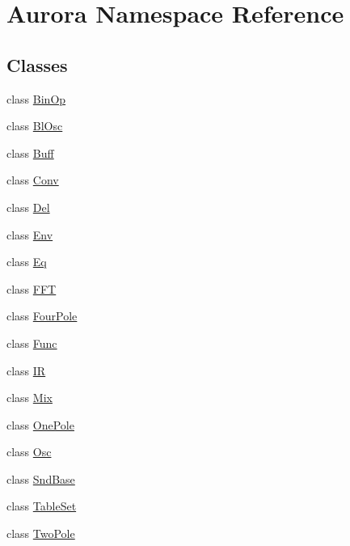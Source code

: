 \hypertarget{namespace_aurora}{}\section{Aurora Namespace Reference}
\label{namespace_aurora}
\subsection*{Classes}
\begin{DoxyCompactItemize}
\item 
class \hyperlink{class_aurora_1_1_bin_op}{Bin\+Op}
\item 
class \hyperlink{class_aurora_1_1_bl_osc}{Bl\+Osc}
\item 
class \hyperlink{class_aurora_1_1_buff}{Buff}
\item 
class \hyperlink{class_aurora_1_1_conv}{Conv}
\item 
class \hyperlink{class_aurora_1_1_del}{Del}
\item 
class \hyperlink{class_aurora_1_1_env}{Env}
\item 
class \hyperlink{class_aurora_1_1_eq}{Eq}
\item 
class \hyperlink{class_aurora_1_1_f_f_t}{F\+FT}
\item 
class \hyperlink{class_aurora_1_1_four_pole}{Four\+Pole}
\item 
class \hyperlink{class_aurora_1_1_func}{Func}
\item 
class \hyperlink{class_aurora_1_1_i_r}{IR}
\item 
class \hyperlink{class_aurora_1_1_mix}{Mix}
\item 
class \hyperlink{class_aurora_1_1_one_pole}{One\+Pole}
\item 
class \hyperlink{class_aurora_1_1_osc}{Osc}
\item 
class \hyperlink{class_aurora_1_1_snd_base}{Snd\+Base}
\item 
class \hyperlink{class_aurora_1_1_table_set}{Table\+Set}
\item 
class \hyperlink{class_aurora_1_1_two_pole}{Two\+Pole}
\end{DoxyCompactItemize}
